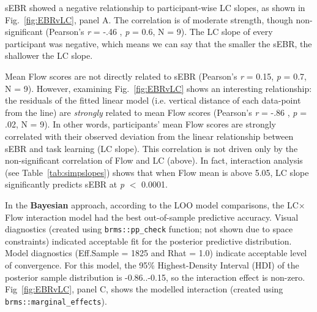 \documentclass[10pt,letterpaper,floatsintext]{article}
\begin{document}
sEBR showed a negative relationship to participant-wise LC slopes, as shown in Fig.~\ref{fig:EBRvLC}, panel A. The correlation is of moderate strength, though non-significant (Pearson's {\it r} = -.46 , {\it p} = 0.6, N = 9). %
The LC slope of every participant was negative, which means we can say that the smaller the sEBR, the shallower the LC slope.%


Mean Flow scores are not directly related to sEBR (Pearson's {\it r} = 0.15, {\it p} = 0.7, N = 9). %
However, examining Fig.~\ref{fig:EBRvLC} shows an interesting relationship: the residuals of the fitted linear model (i.e. vertical distance of each data-point from the line) are {\it strongly} related to mean Flow scores (Pearson's {\it r} = -.86 , {\it p} = .02, N = 9). %
In other words, participants' mean Flow scores are strongly correlated with their observed deviation from the linear relationship between sEBR and task learning (LC slope). This correlation is not driven only by the non-significant correlation of Flow and LC (above). In fact, interaction analysis (see Table~\ref{tab:simpslopes}) shows that when Flow mean is above 5.05, LC slope significantly predicts sEBR at {\it p} $<$ 0.0001. %

In the \textbf{Bayesian} approach, according to the LOO model comparisons, the LC$\times$Flow interaction model had the best out-of-sample predictive accuracy. Visual diagnostics (created using \verb|brms::pp_check| function; not shown due to space constraints) indicated acceptable fit for the posterior predictive distribution. Model diagnostics (Eff.Sample = 1825 and Rhat = 1.0) indicate acceptable level of convergence. For this model, the 95\% Highest-Density Interval (HDI) of the posterior sample distribution is -0.86..-0.15, so the interaction effect is non-zero. Fig~\ref{fig:EBRvLC}, panel C, shows the modelled interaction (created using \verb|brms::marginal_effects|).
\end{document}
